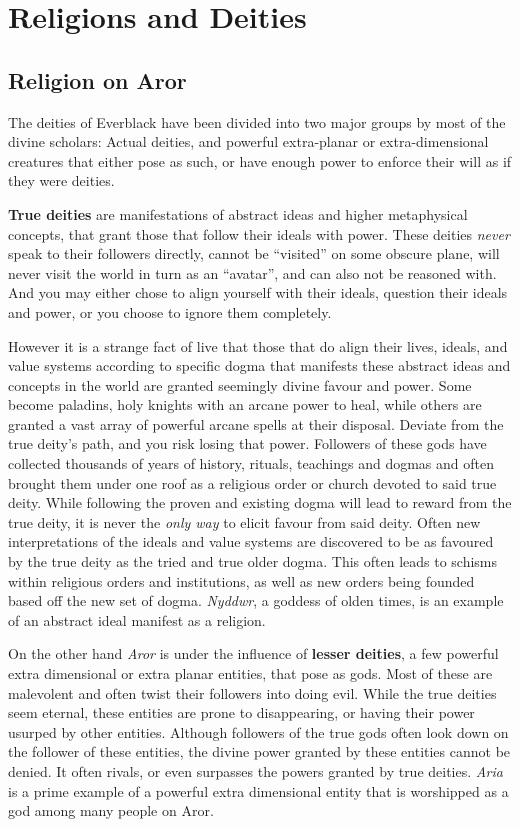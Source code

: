 \chapter{Religions and Deities}

\section{Religion on Aror}
\label{sec:Religion}

The deities of Everblack have been divided into two major groups by most of
the divine scholars: Actual deities, and powerful extra-planar or
extra-dimensional creatures that either pose as such, or have enough power to
enforce their will as if they were deities.

\textbf{True deities} are manifestations of abstract ideas and higher
metaphysical concepts, that grant those that follow their ideals with
power. These deities \emph{never} speak to their followers directly, cannot be
``visited'' on some obscure plane, will never visit the world in turn as an
``avatar'', and can also not be reasoned with. And you may either chose to
align yourself with their ideals, question their ideals and power, or you
choose to ignore them completely.

However it is a strange fact of live that those that do align their lives,
ideals, and value systems according to specific dogma that manifests these
abstract ideas and concepts in the world are granted seemingly divine favour
and power. Some become paladins, holy knights with an arcane power to heal,
while others are granted a vast array of powerful arcane spells at their
disposal. Deviate from the true deity's path, and you risk losing that
power. Followers of these gods have collected thousands of years of history,
rituals, teachings and dogmas and often brought them under one roof as a
religious order or church devoted to said true deity. While following the
proven and existing dogma will lead to reward from the true deity, it is never
the \emph{only way} to elicit favour from said deity. Often new
interpretations of the ideals and value systems are discovered to be as
favoured by the true deity as the tried and true older dogma. This often leads
to schisms within religious orders and institutions, as well as new orders
being founded based off the new set of dogma. \emph{Nyddwr}, a goddess of
olden times, is an example of an abstract ideal manifest as a religion.

On the other hand \emph{Aror} is under the influence of \textbf{lesser
  deities}, a few powerful extra dimensional or extra planar entities, that
pose as gods. Most of these are malevolent and often twist their followers
into doing evil. While the true deities seem eternal, these entities are prone
to disappearing, or having their power usurped by other entities. Although
followers of the true gods often look down on the follower of these entities,
the divine power granted by these entities cannot be denied. It often rivals,
or even surpasses the powers granted by true deities. \emph{Aria} is a prime
example of a powerful extra dimensional entity that is worshipped as a god
among many people on Aror.


